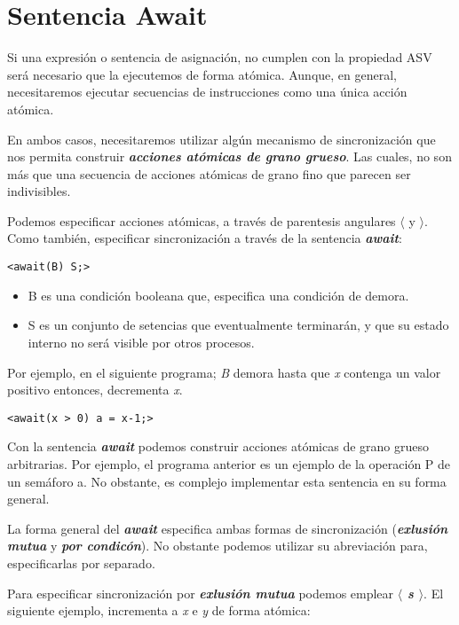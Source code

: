 \documentclass[a4paper, 10pt]{report}
\begin{document}
\section{Sentencia Await}

Si una expresión o sentencia de asignación, no cumplen con la propiedad ASV será necesario que la ejecutemos de forma atómica. Aunque, en general, necesitaremos ejecutar secuencias de instrucciones como una única acción atómica.

En ambos casos, necesitaremos utilizar algún mecanismo de sincronización que nos permita construir \textbf{\emph{acciones atómicas de grano grueso}}. Las cuales, no son más que una secuencia de acciones atómicas de grano fino que parecen ser indivisibles.

Podemos especificar acciones atómicas, a través de parentesis angulares \textbf{\emph{$\langle$}} y \textbf{\emph{$\rangle$}}. Como también, especificar sincronización a través de la sentencia \textbf{\emph{await}}:

\begin{lstlisting}
<await(B) S;>
\end{lstlisting}

\begin{itemize}
    \item B es una condición booleana que, especifica una condición de demora.
    \item S es un conjunto de setencias que eventualmente terminarán, y que su estado interno no será visible por otros procesos.
\end{itemize}

Por ejemplo, en el siguiente programa; \emph{B} demora hasta que \emph{x} contenga un valor positivo entonces, decrementa \emph{x}.

\begin{lstlisting}
<await(x > 0) a = x-1;>
\end{lstlisting}

Con la sentencia \textbf{\emph{await}} podemos construir acciones atómicas de grano grueso arbitrarias. Por ejemplo, el programa anterior es un ejemplo de la operación P de un semáforo a. No obstante, es complejo implementar esta sentencia en su forma general.

La forma general del \textbf{\emph{await}} especifica ambas formas de sincronización (\textbf{\emph{exlusión mutua}} y \textbf{\emph{por condicón}}). No obstante podemos utilizar su abreviación para, especificarlas por separado.

Para especificar sincronización por \textbf{\emph{exlusión mutua}} podemos emplear \textbf{\emph{$\langle$ s $\rangle$}}. El siguiente ejemplo, incrementa a \emph{x} e \emph{y} de forma atómica:
\end{document}
